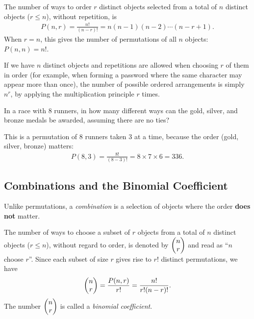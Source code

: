\begin{definicion}
	The number of ways to order $r$ distinct objects selected from a total of $n$ distinct objects ($r \leq n$), without repetition, is
	\begin{align}
		\label{eq:conteo.2}
		P(n,r) = \frac{n!}{(n-r)!} = n(n-1)(n-2)\cdots(n-r+1).
	\end{align}
	When $r=n$, this gives the number of permutations of all $n$ objects: $P(n,n) = n!$.
\end{definicion}

\begin{observacion}
	If we have $n$ distinct objects and repetitions are allowed when choosing $r$ of them in order (for example, when forming a password where the same character may appear more than once), the number of possible ordered arrangements is simply $n^r$, by applying the multiplication principle $r$ times.
\end{observacion}

\begin{ejemplo}
	\label{exmp:conteo.2}
	In a race with $8$ runners, in how many different ways can the gold, silver, and bronze medals be awarded, assuming there are no ties?
\end{ejemplo}

\begin{solucion}
	This is a permutation of $8$ runners taken $3$ at a time, because the order (gold, silver, bronze) matters:
	\begin{align}
		P(8,3) = \frac{8!}{(8-3)!} = 8 \times 7 \times 6 = 336.
	\end{align}
\end{solucion}

\subsection{Combinations and the Binomial Coefficient}

Unlike permutations, a \emph{combination} is a selection of objects where the order \textbf{does not} matter.

\begin{definicion}
	The number of ways to choose a subset of $r$ objects from a total of $n$ distinct objects ($r \leq n$), without regard to order, is denoted by $\begin{pmatrix} n \\ r\end{pmatrix}$ and read as ``$n$ choose $r$''. Since each subset of size $r$ gives rise to $r!$ distinct permutations, we have
	\begin{align}
		\label{eq:conteo.3}
		\begin{pmatrix} n \\ r\end{pmatrix} = \frac{P(n,r)}{r!} = \frac{n!}{r!(n-r)!}.
	\end{align}
	The number $\begin{pmatrix} n \\ r\end{pmatrix}$ is called a \emph{binomial coefficient}.
\end{definicion}

